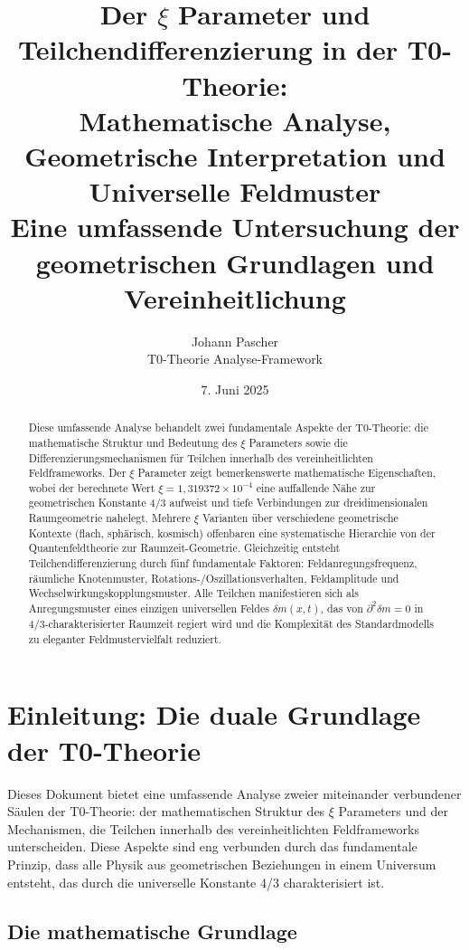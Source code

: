 \documentclass[12pt,a4paper]{article}
\title{Der $\xi$ Parameter und Teilchendifferenzierung in der T0-Theorie: \\
	Mathematische Analyse, Geometrische Interpretation und Universelle Feldmuster \\
	\large Eine umfassende Untersuchung der geometrischen Grundlagen und Vereinheitlichung}
\author{Johann Pascher \\
	T0-Theorie Analyse-Framework}
\date{7. Juni 2025}
\newcommand{\mytimes}{\ensuremath{\times}}
\begin{document}
	
	\maketitle
	
	\begin{abstract}
		Diese umfassende Analyse behandelt zwei fundamentale Aspekte der T0-Theorie: die mathematische Struktur und Bedeutung des $\xi$ Parameters sowie die Differenzierungsmechanismen für Teilchen innerhalb des vereinheitlichten Feldframeworks. Der $\xi$ Parameter zeigt bemerkenswerte mathematische Eigenschaften, wobei der berechnete Wert $\xi = 1,319372 \mytimes 10^{-4}$ eine auffallende Nähe zur geometrischen Konstante 4/3 aufweist und tiefe Verbindungen zur dreidimensionalen Raumgeometrie nahelegt. Mehrere $\xi$ Varianten über verschiedene geometrische Kontexte (flach, sphärisch, kosmisch) offenbaren eine systematische Hierarchie von der Quantenfeldtheorie zur Raumzeit-Geometrie. Gleichzeitig entsteht Teilchendifferenzierung durch fünf fundamentale Faktoren: Feldanregungsfrequenz, räumliche Knotenmuster, Rotations-/Oszillationsverhalten, Feldamplitude und Wechselwirkungskopplungsmuster. Alle Teilchen manifestieren sich als Anregungsmuster eines einzigen universellen Feldes $\delta m(x,t)$, das von $\partial^2\delta m = 0$ in 4/3-charakterisierter Raumzeit regiert wird und die Komplexität des Standardmodells zu eleganter Feldmustervielfalt reduziert.
	\end{abstract}
	
	\tableofcontents
	\newpage
	
	\section{Einleitung: Die duale Grundlage der T0-Theorie}
	\label{sec:einleitung}
	
	Dieses Dokument bietet eine umfassende Analyse zweier miteinander verbundener Säulen der T0-Theorie: der mathematischen Struktur des $\xi$ Parameters und der Mechanismen, die Teilchen innerhalb des vereinheitlichten Feldframeworks unterscheiden. Diese Aspekte sind eng verbunden durch das fundamentale Prinzip, dass alle Physik aus geometrischen Beziehungen in einem Universum entsteht, das durch die universelle Konstante 4/3 charakterisiert ist.
	
	\subsection{Die mathematische Grundlage}
	\label{subsec:mathematische_grundlage}
	
\end{document}
